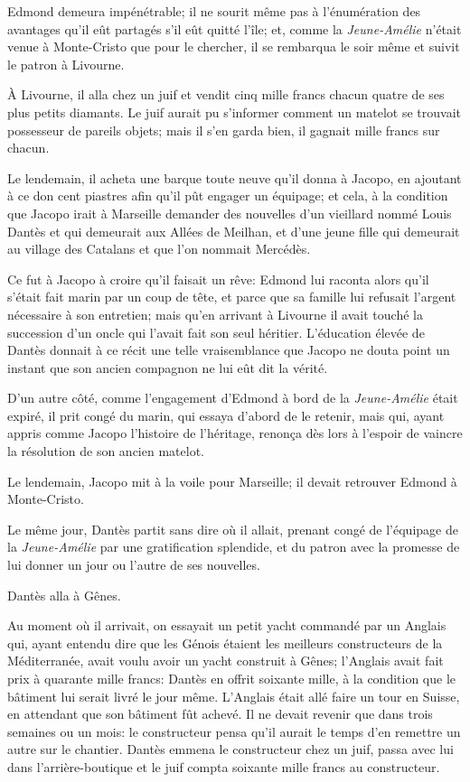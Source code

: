 Edmond demeura impénétrable; il ne sourit même pas à l'énumération des avantages qu'il eût partagés s'il eût quitté l'île; et, comme la \textit{Jeune-Amélie} n'était venue à Monte-Cristo que pour le chercher, il se rembarqua le soir même et suivit le patron à Livourne.

À Livourne, il alla chez un juif et vendit cinq mille francs chacun quatre de ses plus petits diamants. Le juif aurait pu s'informer comment un matelot se trouvait possesseur de pareils objets; mais il s'en garda bien, il gagnait mille francs sur chacun.

Le lendemain, il acheta une barque toute neuve qu'il donna à Jacopo, en ajoutant à ce don cent piastres afin qu'il pût engager un équipage; et cela, à la condition que Jacopo irait à Marseille demander des nouvelles d'un vieillard nommé Louis Dantès et qui demeurait aux Allées de Meilhan, et d'une jeune fille qui demeurait au village des Catalans et que l'on nommait Mercédès.

Ce fut à Jacopo à croire qu'il faisait un rêve: Edmond lui raconta alors qu'il s'était fait marin par un coup de tête, et parce que sa famille lui refusait l'argent nécessaire à son entretien; mais qu'en arrivant à Livourne il avait touché la succession d'un oncle qui l'avait fait son seul héritier. L'éducation élevée de Dantès donnait à ce récit une telle vraisemblance que Jacopo ne douta point un instant que son ancien compagnon ne lui eût dit la vérité.

D'un autre côté, comme l'engagement d'Edmond à bord de la \textit{Jeune-Amélie} était expiré, il prit congé du marin, qui essaya d'abord de le retenir, mais qui, ayant appris comme Jacopo l'histoire de l'héritage, renonça dès lors à l'espoir de vaincre la résolution de son ancien matelot.

Le lendemain, Jacopo mit à la voile pour Marseille; il devait retrouver Edmond à Monte-Cristo.

Le même jour, Dantès partit sans dire où il allait, prenant congé de l'équipage de la \textit{Jeune-Amélie} par une gratification splendide, et du patron avec la promesse de lui donner un jour ou l'autre de ses nouvelles.

Dantès alla à Gênes.

Au moment où il arrivait, on essayait un petit yacht commandé par un Anglais qui, ayant entendu dire que les Génois étaient les meilleurs constructeurs de la Méditerranée, avait voulu avoir un yacht construit à Gênes; l'Anglais avait fait prix à quarante mille francs: Dantès en offrit soixante mille, à la condition que le bâtiment lui serait livré le jour même. L'Anglais était allé faire un tour en Suisse, en attendant que son bâtiment fût achevé. Il ne devait revenir que dans trois semaines ou un mois: le constructeur pensa qu'il aurait le temps d'en remettre un autre sur le chantier. Dantès emmena le constructeur chez un juif, passa avec lui dans l'arrière-boutique et le juif compta soixante mille francs au constructeur.

